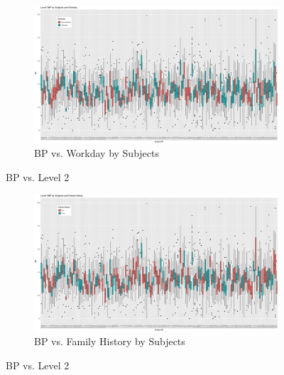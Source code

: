 \documentclass[12pt,twoside,letterpaper]{article}
\theoremstyle{definition}
\theoremstyle{definition}
\newcommand{\detailtexcount}[1]{ %
\immediate\write18{texcount -merge -sum #1.tex > #1.wcdetail }%
%
}
\begin{document}
\begin{appendices}
    \begin{figure}[h] \ContinuedFloat
        \centering
        \begin{subfigure}[b]{\textwidth}
            \centering
            \includegraphics[width=\textwidth]{pics/bp by id and day.png}
            \caption{BP vs. Workday by Subjects}
            \label{fig: bp v id and day}
        \end{subfigure}
        \caption{BP vs. Level 2}
        \label{fig: bp v id and level2_2}
    \end{figure}

    \begin{figure}[h] \ContinuedFloat
        \centering
        \begin{subfigure}[b]{\textwidth}
            \centering
            \includegraphics[width=\textwidth]{pics/bp by id and fh.png}
            \caption{BP vs. Family History by Subjects}
            \label{fig: bp v id and fh}
        \end{subfigure}
        \caption{BP vs. Level 2}
        \label{fig: bp v id and level2_3}
    \end{figure}

\end{appendices}

\singlespacing
% 
% 
\printbibliography
\end{document}
